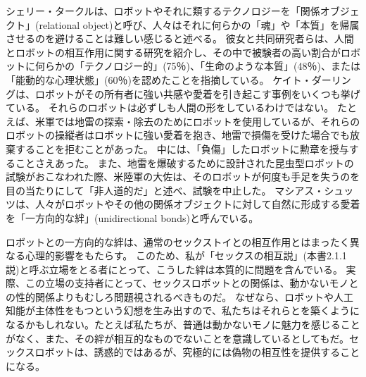 \documentclass[paper=a4,book,openany]{jlreq}
\newcommand{\ig}[1]{}           %
\begin{document}
シェリー・タークルは、ロボットやそれに類するテクノロジーを「関係オブジェクト」(relational object)と呼び、人々はそれに何らかの「魂」や「本質」を帰属させるのを避けることは難しい感じると述べる。
彼女と共同研究者らは、人間とロボットの相互作用に関する研究を紹介し、その中で被験者の高い割合がロボットに何らかの「テクノロジー的」(75％)、「生命のような本質」(48％)、または「能動的な心理状態」(60％)を認めたことを指摘している\citep[p.349]{turkle18:_relat_artif_child_elder}。
ケイト・ダーリング\ig{Kate Darling}は、ロボットがその所有者に強い共感や愛着を引き起こす事例をいくつも挙げている。
それらのロボットは必ずしも人間の形をしているわけではない。
たとえば、米軍では地雷の探索・除去のためにロボットを使用しているが、それらのロボットの操縦者はロボットに強い愛着を抱き、地雷で損傷を受けた場合でも放棄することを拒むことがあった。
中には、「負傷」したロボットに勲章を授与することさえあった。
また、地雷を爆破するために設計された昆虫型ロボットの試験がおこなわれた際、米陸軍の大佐は、そのロボットが何度も手足を失うのを目の当たりにして「非人道的だ」と述べ、試験を中止した\citep{darling16:_exten_legal_protec_social_robot}。
マシアス・シュッツは、人々がロボットやその他の関係オブジェクトに対して自然に形成する愛着を「一方向的な絆」(unidirectional bonds)と呼んでいる\citep{scheutz12:_inher_danger_unidir_emotion_bonds}。

ロボットとの一方向的な絆は、通常のセックストイとの相互作用とはまったく異なる心理的影響をもたらす。
このため、私が「セックスの相互説」(本書2.1.1説)と呼ぶ立場をとる者にとって、こうした絆は本質的に問題を含んでいる。
実際、この立場の支持者にとって、セックスロボットとの関係は、動かないモノとの性的関係よりもむしろ問題視されるべきものだ。
なぜなら、ロボットや人工知能が主体性をもつという幻想を生み出すので、私たちはそれらとを築くようになるかもしれない。たとえば私たちが、普通は動かないモノに魅力を感じることがなく、また、その絆が相互的なものでないことを意識しているとしてもだ。セックスロボットは、誘惑的ではあるが、究極的には偽物の相互性を提供することになる。
\end{document}
